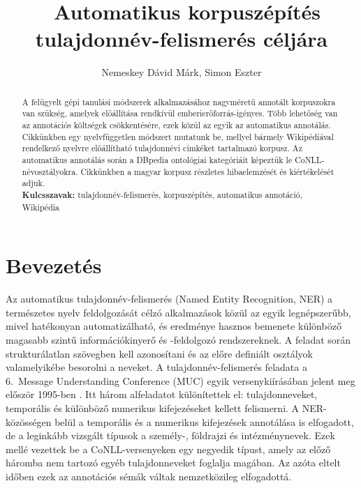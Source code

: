 \documentclass{llncs}
\begin{document}
\pagestyle{myheadings}
\def\leftmark{{\rm IX. Magyar Sz\'am\'\i t\'og\'epes Nyelv\'eszeti Konferencia}}
\def\rightmark{{\rm Szeged, 2013. január 7-8.}}

\setcounter{page}{3}

\title{\ \break Automatikus korpuszépítés tulajdonnév-felismerés céljára}
\author{Nemeskey Dávid Márk, Simon Eszter}

\maketitle

\begin{abstract}
A felügyelt gépi tanulási módszerek alkalmazásához nagyméretű annotált korpuszokra van szükség, amelyek előállítása rendkívül emberierőforrás-igényes. Több lehetőség van az annotációs költségek csökkentésére, ezek közül az egyik az automatikus annotálás. Cikkünkben egy nyelvfüggetlen módszert mutatunk be, mellyel bármely Wikipédiával rendelkező nyelvre előállítható tulajdonnévi címkéket tartalmazó korpusz. Az automatikus annotálás során a DBpedia ontológiai kategóriáit képeztük le CoNLL-névosztályokra. Cikkünkben a magyar korpusz részletes hibaelemzését és kiértékelését adjuk. 
\\[2mm]
{\bf Kulcsszavak:} tulajdonnév-felismerés, korpuszépítés,
automatikus annotáció, Wikipédia
\end{abstract}

\section{Bevezet\'es}

Az automatikus tulajdonnév-felismerés (Named Entity Recognition, NER) a természetes nyelv feldolgozását célzó alkalmazások közül az egyik legnépszerűbb, mivel hatékonyan automatizálható, és eredménye hasznos bemenete különböző magasabb szintű információkinyerő és -feldolgozó rendszereknek. A feladat során strukturálatlan szövegben kell azonosítani és az előre definiált osztályok valamelyikébe besorolni a neveket. A tulajdonnév-felismerés feladata a 6.~Message Understanding Conference (MUC) egyik versenykiírásában jelent meg először 1995-ben \cite{MUC6}. Itt három alfeladatot különítettek el: tulajdonneveket, temporális és különböző numerikus kifejezéseket kellett felismerni. A NER-közösségen belül a temporális és a numerikus kifejezések annotálása is elfogadott, de a leginkább vizsgált típusok a személy-, földrajzi és intézménynevek. Ezek mellé vezettek be a CoNLL-versenyeken \cite{tksintro2002conll} \cite{conll2003intro} egy negyedik típust, amely az előző háromba nem tartozó egyéb tulajdonneveket foglalja magában. Az azóta eltelt időben ezek az annotációs sémák váltak nemzetközileg elfogadottá. 
\end{document}
